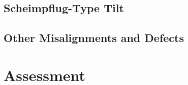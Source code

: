 
\subsection{Scheimpflug-Type Tilt}
\label{sec:discussion-scheimpflug}


\subsection{Other Misalignments and Defects}
\label{sec:discussion-other}


\section{Assessment}
\label{sec:discussion-assessment}

